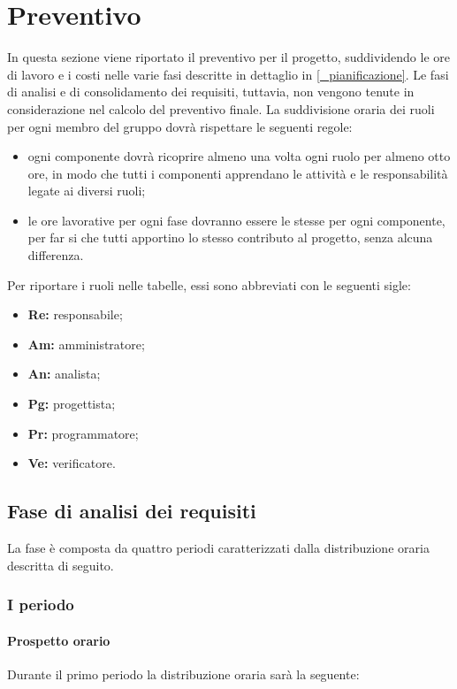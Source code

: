 \section{Preventivo} \label{_preventivo}
In questa sezione viene riportato il preventivo per il progetto, suddividendo le ore di lavoro e i costi nelle varie fasi descritte in dettaglio in \ref{_pianificazione}.
Le fasi di analisi e di consolidamento dei requisiti, tuttavia, non vengono tenute in considerazione nel calcolo del preventivo finale.
La suddivisione oraria dei ruoli per ogni membro del gruppo dovrà rispettare le seguenti regole:
		\begin{itemize}
		\item ogni componente dovrà ricoprire almeno una volta ogni ruolo per almeno otto ore, in modo che tutti i componenti apprendano le attività e le responsabilità legate ai diversi ruoli;
		\item le ore lavorative per ogni fase dovranno essere le stesse per ogni componente, per far si che tutti apportino lo stesso contributo al progetto, senza alcuna differenza.
	\end{itemize}
	 Per riportare i ruoli nelle tabelle, essi sono abbreviati con le seguenti sigle:
			\begin{itemize}
			\item\textbf{Re:} responsabile;
			\item\textbf{Am:} amministratore;
			\item\textbf{An:} analista;
			\item\textbf{Pg:} progettista;
			\item\textbf{Pr:} programmatore;
			\item\textbf{Ve:} verificatore.
		\end{itemize}
	
	\subsection{Fase di analisi dei requisiti}
	La fase è composta da quattro periodi caratterizzati dalla distribuzione oraria descritta di seguito.

	\subsubsection{I periodo}
	\paragraph{Prospetto orario}
			Durante il primo periodo la distribuzione oraria sarà la seguente:
			
